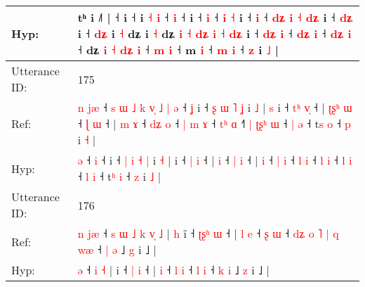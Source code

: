 \documentclass[10pt]{article}
\DeclareRobustCommand{\hl}[1]{{\textcolor{red}{#1}}}
\begin{document}
\begin{longtable}{ll}
 \\
Hyp: & tʰ i ˩˥ |\hl{}\hl{} ˧\hl{}\hl{} i ˧\hl{}\hl{}\hl{}\hl{}\hl{}\hl{}\hl{}\hl{} i\hl{}\hl{}\hl{}\hl{}\hl{}\hl{}\hl{}\hl{}\hl{}\hl{}\hl{} \hl{˧} \hl{}\hl{i} ˧\hl{}\hl{} \hl{i} ˧\hl{}\hl{} i ˧\hl{}\hl{} \hl{i} ˧ \hl{i} \hl{˧} i ˧\hl{}\hl{} \hl{}\hl{i} ˧\hl{}\hl{} \hl{}\hl{d}\hl{ʑ} \hl{i} \hl{˧} \hl{}\hl{d}\hl{ʑ} i ˧ \hl{}\hl{d}\hl{ʑ} i\hl{} ˧\hl{}\hl{}\hl{}\hl{} \hl{}\hl{d}\hl{ʑ} i\hl{} \hl{˧} dʑ\hl{}\hl{}\hl{}\hl{}\hl{}\hl{} i\hl{} \hl{˧} dʑ\hl{}\hl{}\hl{}\hl{}\hl{}\hl{} \hl{i} \hl{˧} \hl{}\hl{d}\hl{ʑ} \hl{i} \hl{˧} \hl{}\hl{d}\hl{ʑ} i ˧ \hl{d}\hl{ʑ} \hl{}\hl{i} ˧\hl{}\hl{} \hl{}\hl{d}\hl{ʑ} \hl{i} ˧ \hl{d}\hl{ʑ} \hl{i} ˧ dʑ \hl{i} \hl{˧} \hl{}\hl{d}\hl{ʑ} \hl{i} ˧ \hl{}\hl{m} \hl{i} ˧\hl{}\hl{} m \hl{i} ˧ \hl{}\hl{m} \hl{i} ˧\hl{}\hl{}\hl{} \hl{z} i \hl{˩} |
 \\
\midrule
Utterance ID: & 175 \\
Ref: & \hl{n}\hl{ }\hl{j}\hl{æ} ˧\hl{ }\hl{s}\hl{ }\hl{ɯ}\hl{ }\hl{˩}\hl{ }\hl{k}\hl{ }\hl{v}\hl{̩}\hl{ }\hl{˩}\hl{ }\hl{|} \hl{ə} ˧\hl{ }\hl{ʝ} i ˧ \hl{ʂ} \hl{ɯ} \hl{˥} \hl{ʝ} i \hl{˩} |\hl{ }\hl{s} i ˧ \hl{t}\hl{ʰ} \hl{v}\hl{̩} ˧ |\hl{ }\hl{ʈ}\hl{ʂ}\hl{ʰ} \hl{ɯ} ˧ \hl{ɭ} \hl{ɯ} ˧ |\hl{ }\hl{m} \hl{ɤ} ˧ \hl{d}\hl{ʑ} \hl{o} ˧\hl{ }\hl{|} \hl{m} \hl{ɤ} ˧ \hl{t}\hl{ʰ} \hl{ɑ} ˧\hl{˥}\hl{ }\hl{|} \hl{ʈ}\hl{ʂ}\hl{ʰ} \hl{ɯ} ˧ \hl{|} \hl{ə} ˧ t\hl{s} \hl{o} ˧ \hl{p} i \hl{˧} |
 \\
Hyp: & \hl{}\hl{}\hl{}\hl{ə} ˧\hl{}\hl{}\hl{}\hl{}\hl{}\hl{}\hl{}\hl{}\hl{}\hl{}\hl{}\hl{}\hl{}\hl{}\hl{} \hl{i} ˧\hl{}\hl{} i ˧ \hl{|} \hl{i} \hl{˧} \hl{|} i \hl{˧} |\hl{}\hl{} i ˧ \hl{}\hl{|} \hl{}\hl{i} ˧ |\hl{}\hl{}\hl{}\hl{} \hl{i} ˧ \hl{|} \hl{i} ˧ |\hl{}\hl{} \hl{i} ˧ \hl{}\hl{|} \hl{i} ˧\hl{}\hl{} \hl{l} \hl{i} ˧ \hl{}\hl{l} \hl{i} ˧\hl{}\hl{}\hl{} \hl{}\hl{}\hl{l} \hl{i} ˧ \hl{l} \hl{i} ˧ t\hl{ʰ} \hl{i} ˧ \hl{z} i \hl{˩} |
 \\
\midrule
Utterance ID: & 176 \\
Ref: & \hl{n}\hl{ }\hl{j}\hl{æ} ˧\hl{ }\hl{s}\hl{ }\hl{ɯ}\hl{ }\hl{˩}\hl{ }\hl{k} \hl{v}\hl{̩} \hl{˩} |\hl{ }\hl{h} i\hl{̃} ˧ \hl{ʈ}\hl{ʂ}\hl{ʰ} \hl{ɯ} ˧ |\hl{ }\hl{l} \hl{e} ˧ \hl{ʂ} \hl{ɯ} ˧\hl{ }\hl{d}\hl{ʑ}\hl{ }\hl{o}\hl{ }\hl{˥}\hl{ }\hl{|} \hl{q} \hl{w}\hl{æ} ˧ \hl{|} \hl{ə} ˩ \hl{g} i ˩ |
 \\
Hyp: & \hl{}\hl{}\hl{}\hl{ə} ˧\hl{}\hl{}\hl{}\hl{}\hl{}\hl{}\hl{}\hl{} \hl{}\hl{i} \hl{˧} |\hl{}\hl{} i\hl{} ˧ \hl{}\hl{}\hl{|} \hl{i} ˧ |\hl{}\hl{} \hl{i} ˧ \hl{l} \hl{i} ˧\hl{}\hl{}\hl{}\hl{}\hl{}\hl{}\hl{}\hl{}\hl{} \hl{l} \hl{}\hl{i} ˧ \hl{k} \hl{i} ˩ \hl{z} i ˩ |

\end{longtable}
\end{document}
